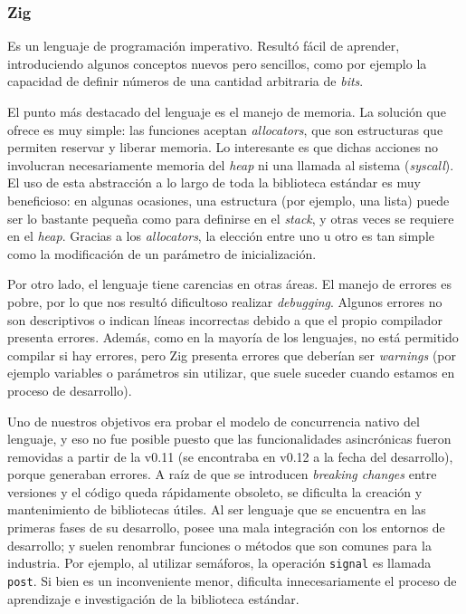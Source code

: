 \documentclass[11pt]{article}
\let\Oldsubsubsection\subsubsection
\renewcommand{\subsubsection}{\FloatBarrier\Oldsubsubsection}
\newcommand{\english}[1]{\textit{#1}}
\begin{document}
\subsubsection{Zig}

Es un lenguaje de programación imperativo. Resultó fácil de aprender, introduciendo algunos conceptos nuevos pero sencillos, como por ejemplo la capacidad de definir números de una cantidad arbitraria de \english{bits}.

El punto más destacado del lenguaje es el manejo de memoria. La solución que ofrece es muy simple: las funciones aceptan \english{allocators}, que son estructuras que permiten reservar y liberar memoria. Lo interesante es que dichas acciones no involucran necesariamente memoria del \english{heap} ni una llamada al sistema (\english{syscall}). El uso de esta abstracción a lo largo de toda la biblioteca estándar es muy beneficioso: en algunas ocasiones, una estructura (por ejemplo, una lista) puede ser lo bastante pequeña como para definirse en el \english{stack}, y otras veces se requiere en el \english{heap}. Gracias a los \english{allocators}, la elección entre uno u otro es tan simple como la modificación de un parámetro de inicialización.

Por otro lado, el lenguaje tiene carencias en otras áreas. El manejo de errores es pobre, por lo que nos resultó dificultoso realizar \english{debugging}. Algunos errores no son descriptivos o indican líneas incorrectas debido a que el propio compilador presenta errores. Además, como en la mayoría de los lenguajes, no está permitido compilar si hay errores, pero Zig presenta errores que deberían ser \english{warnings} (por ejemplo variables o parámetros sin utilizar, que suele suceder cuando estamos en proceso de desarrollo). 

Uno de nuestros objetivos era probar el modelo de concurrencia nativo del lenguaje, y eso no fue posible puesto que las funcionalidades asincrónicas fueron removidas a partir de la v0.11 (se encontraba en v0.12 a la fecha del desarrollo), porque generaban errores. A raíz de que se introducen \english{breaking changes} entre versiones y el código queda rápidamente obsoleto, se dificulta la creación y mantenimiento de bibliotecas útiles. Al ser lenguaje que se encuentra en las primeras fases de su desarrollo, posee una mala integración con los entornos de desarrollo; y suelen renombrar funciones o métodos que son comunes para la industria. Por ejemplo, al utilizar semáforos, la operación \lstinline{signal} es llamada \lstinline{post}. Si bien es un inconveniente menor, dificulta innecesariamente el proceso de aprendizaje e investigación de la biblioteca estándar.
\end{document}
